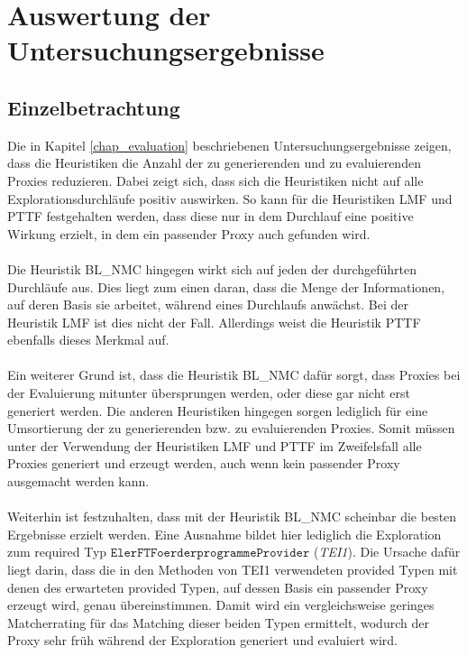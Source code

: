 \section{Auswertung der Untersuchungsergebnisse}
\subsection{Einzelbetrachtung}\label{disc_einzel}
Die in Kapitel \ref{chap_evaluation} beschriebenen Untersuchungsergebnisse zeigen, dass die Heuristiken die Anzahl der zu generierenden und zu evaluierenden Proxies reduzieren. Dabei zeigt sich, dass sich die Heuristiken nicht auf alle Explorationsdurchläufe positiv auswirken. So kann für die Heuristiken LMF und PTTF festgehalten werden, dass diese nur in dem Durchlauf eine positive Wirkung erzielt, in dem ein passender Proxy auch gefunden wird.
\\\\
Die Heuristik BL\_NMC hingegen wirkt sich auf jeden der durchgeführten Durchläufe aus. Dies liegt zum einen daran, dass die Menge der Informationen, auf deren Basis sie arbeitet, während eines Durchlaufs anwächst. Bei der Heuristik LMF ist dies nicht der Fall. Allerdings weist die Heuristik PTTF ebenfalls dieses Merkmal auf.
\\\\
Ein weiterer Grund ist, dass die Heuristik BL\_NMC dafür sorgt, dass Proxies bei der Evaluierung mitunter übersprungen werden, oder diese gar nicht erst generiert werden. Die anderen Heuristiken hingegen sorgen lediglich für eine Umsortierung der zu generierenden bzw. zu evaluierenden Proxies. Somit müssen unter der Verwendung der Heuristiken LMF und PTTF im Zweifelsfall alle Proxies generiert und erzeugt werden, auch wenn kein passender Proxy ausgemacht werden kann.
\\\\
Weiterhin ist festzuhalten, dass mit der Heuristik BL\_NMC scheinbar die besten Ergebnisse erzielt werden. Eine Ausnahme bildet hier lediglich die Exploration zum required Typ $\texttt{ElerFTFoerderprogrammeProvider}$ (\emph{TEI1}). Die Ursache dafür liegt darin, dass die in den Methoden von TEI1 verwendeten provided Typen mit denen des erwarteten provided Typen, auf dessen Basis ein passender Proxy erzeugt wird, genau übereinstimmen. Damit wird ein vergleichsweise geringes Matcherrating für das Matching dieser beiden Typen ermittelt, wodurch der Proxy sehr früh während der Exploration generiert und evaluiert wird.
